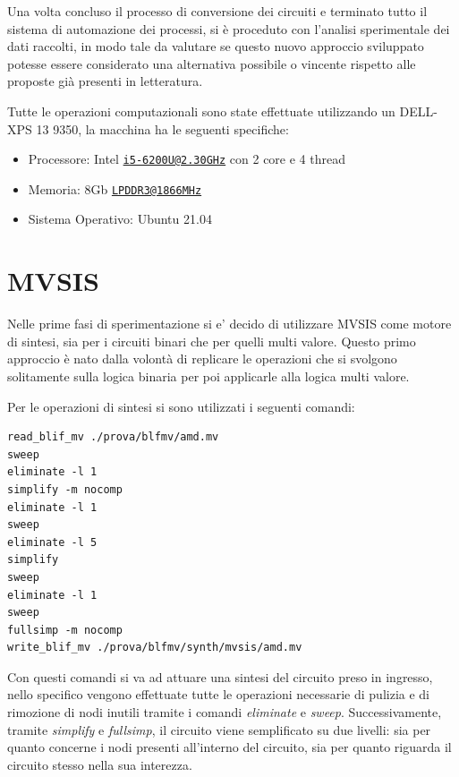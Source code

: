 \documentclass[
  italian,
]{book}
\providecommand{\tightlist}{%
  \setlength{\itemsep}{0pt}\setlength{\parskip}{0pt}}
\begin{document}
Una volta concluso il processo di conversione dei circuiti e terminato tutto il sistema di automazione dei processi, si è proceduto con l'analisi sperimentale dei dati raccolti, in modo tale da valutare se questo nuovo approccio sviluppato potesse essere considerato una alternativa possibile o vincente rispetto alle proposte già presenti in letteratura.

Tutte le operazioni computazionali sono state effettuate utilizzando un DELL-XPS 13 9350, la macchina ha le seguenti specifiche:

\begin{itemize}
\tightlist
\item
  Processore: Intel \href{mailto:i5-6200U@2.30GHz}{\nolinkurl{i5-6200U@2.30GHz}} con 2 core e 4 thread
\item
  Memoria: 8Gb \href{mailto:LPDDR3@1866MHz}{\nolinkurl{LPDDR3@1866MHz}}
\item
  Sistema Operativo: Ubuntu 21.04
\end{itemize}

\newpage

\hypertarget{mvsis-2}{%
\section{MVSIS}\label{mvsis-2}}

Nelle prime fasi di sperimentazione si e' decido di utilizzare MVSIS come motore di sintesi, sia per i circuiti binari che per quelli multi valore. Questo primo approccio è nato dalla volontà di replicare le operazioni che si svolgono solitamente sulla logica binaria per poi applicarle alla logica multi valore.

Per le operazioni di sintesi si sono utilizzati i seguenti comandi:

\begin{verbatim}
read_blif_mv ./prova/blfmv/amd.mv
sweep
eliminate -l 1
simplify -m nocomp
eliminate -l 1
sweep
eliminate -l 5
simplify
sweep
eliminate -l 1
sweep
fullsimp -m nocomp
write_blif_mv ./prova/blfmv/synth/mvsis/amd.mv
\end{verbatim}

Con questi comandi si va ad attuare una sintesi del circuito preso in ingresso, nello specifico vengono effettuate tutte le operazioni necessarie di pulizia e di rimozione di nodi inutili tramite i comandi \emph{eliminate} e \emph{sweep}. Successivamente, tramite \emph{simplify} e \emph{fullsimp}, il circuito viene semplificato su due livelli: sia per quanto concerne i nodi presenti all'interno del circuito, sia per quanto riguarda il circuito stesso nella sua interezza.
\end{document}
